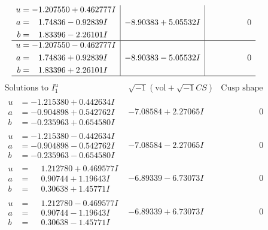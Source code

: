 \documentclass[1p]{elsarticle_modified}
\theoremstyle{definition}
\newcommand{\I}{\sqrt{-1}}
\begin{document}
$$\begin{array}{c|c|c}
\begin{aligned}
u &= -1.207550 + 0.462777 I \\
a &= \phantom{-}1.74836 - 0.92839 I \\
b &= \phantom{-}1.83396 - 2.26101 I\end{aligned}
 & -8.90383 + 5.05532 I & \phantom{-0.000000 } 0 \\ \hline\begin{aligned}
u &= -1.207550 - 0.462777 I \\
a &= \phantom{-}1.74836 + 0.92839 I \\
b &= \phantom{-}1.83396 + 2.26101 I\end{aligned}
 & -8.90383 - 5.05532 I & \phantom{-0.000000 } 0\\
 \hline 
 \end{array}$$\newpage$$\begin{array}{c|c|c}  
\text{Solutions to }I^u_{1}& \I (\text{vol} + \sqrt{-1}CS) & \text{Cusp shape}\\
 \hline 
\begin{aligned}
u &= -1.215380 + 0.442634 I \\
a &= -0.904898 + 0.542762 I \\
b &= -0.235963 + 0.654580 I\end{aligned}
 & -7.08584 + 2.27065 I & \phantom{-0.000000 } 0 \\ \hline\begin{aligned}
u &= -1.215380 - 0.442634 I \\
a &= -0.904898 - 0.542762 I \\
b &= -0.235963 - 0.654580 I\end{aligned}
 & -7.08584 - 2.27065 I & \phantom{-0.000000 } 0 \\ \hline\begin{aligned}
u &= \phantom{-}1.212780 + 0.469577 I \\
a &= \phantom{-}0.90744 + 1.19643 I \\
b &= \phantom{-}0.30638 + 1.45771 I\end{aligned}
 & -6.89339 - 6.73073 I & \phantom{-0.000000 } 0 \\ \hline\begin{aligned}
u &= \phantom{-}1.212780 - 0.469577 I \\
a &= \phantom{-}0.90744 - 1.19643 I \\
b &= \phantom{-}0.30638 - 1.45771 I\end{aligned}
 & -6.89339 + 6.73073 I & \phantom{-0.000000 } 0 \\ \hline\begin{aligned}

\end{aligned}
\end{array}$$
\end{document}

